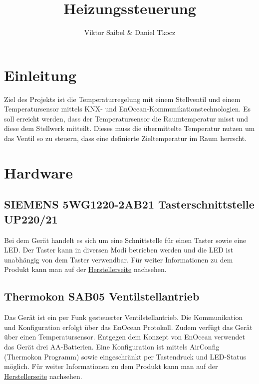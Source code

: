 \documentclass[a4paper]{article}
\begin{document}
\title{Heizungssteuerung}
\author{Viktor Saibel \& Daniel Tkocz}
\maketitle

\newpage

\tableofcontents

\newpage

\section{Einleitung}
Ziel des Projekts ist die Temperaturregelung mit einem Stellventil und einem Temperatursensor mittels KNX- und EnOcean-Kommunikationstechnologien.
Es soll erreicht werden, dass der Temperatursensor die Raumtemperatur misst und diese dem Stellwerk mitteilt. Dieses muss die übermittelte Temperatur nutzen um das Ventil so zu steuern, dass eine definierte Zieltemperatur im Raum herrscht.

\section{Hardware}
\subsection{SIEMENS 5WG1220-2AB21 Tasterschnittstelle UP220/21}
Bei dem Gerät handelt es sich um eine Schnittstelle für einen Taster sowie eine LED. Der Taster kann in diversen Modi betrieben werden und die LED ist unabhängig von dem Taster verwendbar.
Für weiter Informationen zu dem Produkt kann man auf der \href{http://www.buildingtechnologies.siemens.com/bt/global/de/products/Gamma-Geb%C3%A4udesystemtechnik/Gamma-instabus---KNX/Eingabeger%C3%A4te/Seiten/UP%20220_221.aspx}{Herstellerseite} nachsehen.
	\subsection{Thermokon SAB05 Ventilstellantrieb}
	Das Gerät ist ein per Funk gesteuerter Ventilstellantrieb.
	Die Kommunikation und Konfiguration erfolgt über das EnOcean Protokoll.
	Zudem verfügt das Gerät über einen Temperatursensor.
	Entgegen dem Konzept von EnOcean verwendet das Gerät drei AA-Batterien.
	Eine Konfiguration ist mittels AirConfig (Thermokon Programm) sowie eingeschränkt per Tastendruck und LED-Status möglich.
	Für weiter Informationen zu dem Produkt kann man auf der \href{https://www.thermokon.de/en/products/easysensr-receiver/actuators/sab05/}{Herstellerseite} nachsehen.
\end{document}
